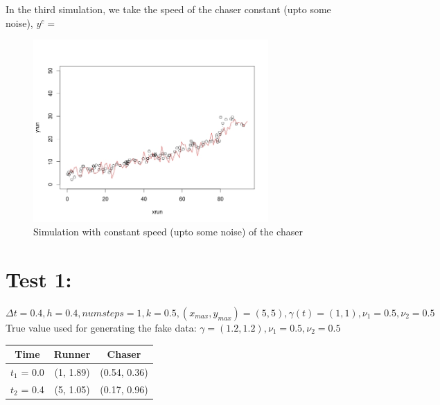 \documentclass[a4paper,11pt]{article}
\begin{document}
In the third simulation, we take the speed of the chaser constant (upto some noise), $y^{c} = $
\begin{figure}[H]
\centering
\includegraphics[width=0.8\textwidth]{sim100points_randomizedtraj.jpeg}
\caption{Simulation with constant speed (upto some noise) of the chaser}
\end{figure}


\section{Test 1:}
$\Delta t = 0.4, h = 0.4, numsteps = 1, k = 0.5, (x_{max}, y_{max}) = (5,5), \gamma(t) = (1,1), \nu_1 = 0.5, \nu_2 = 0.5$ \\

True value used for generating the fake data: $\gamma = (1.2, 1.2), \nu_1 = 0.5, \nu_2 = 0.5$
\begin{table}[H]
\centering
\begin{tabular}{|c|c|c|}
\hline
Time   & Runner & Chaser \\ \hline
$t_1$ = 0.0 & (1, 1.89)  & (0.54, 0.36)  \\ \hline
$t_2$ = 0.4 & (5, 1.05) &  (0.17, 0.96) \\ \hline
\end{tabular}
\end{table}
\end{document}
